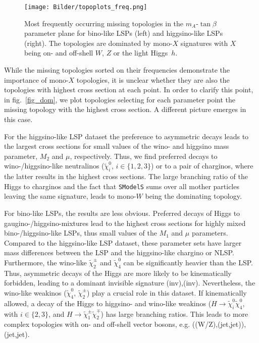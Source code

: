 \documentclass[11pt,a4paper]{article}
\begin{document}
\begin{figure}[h]
\centering
\texttt{[image: Bilder/topoplots\_freq.png]}
\caption{Most frequently occurring missing topologies in the $m_A$-$\tan\beta$ parameter plane for bino-like LSPs (left) and higgsino-like LSPs (right). The topologies are dominated by mono-$X$ signatures with $X$ being on- and off-shell $W$, $Z$ or the light Higgs~$h$.}\label{fig_freq}
\end{figure}
While the missing topologies sorted on their frequencies demonstrate the importance of mono-$X$ topologies, it is unclear whether they are also the topologies with highest cross section at each point. In order to clarify this point, in fig.~\ref{fig_dom}, we plot topologies selecting for each parameter point the missing topology with the highest cross section. A different picture emerges in this case.

For the higgsino-like LSP dataset the preference to asymmetric decays leads to the largest cross sections for small values of the wino- and higgsino mass parameter, $M_2$ and $\mu$, respectively. Thus, we find preferred decays to wino-/higgsino-like neutralinos ($\tilde{\chi}_i^0$, $i\in \lbrace 1,2,3\rbrace$) or to a pair of charginos, where the latter results in the highest cross sections. The large branching ratio of the Higgs to charginos and the fact that \texttt{SModelS} sums over all mother particles leaving the same signature, leads to mono-$W$ being the dominating topology.

For bino-like LSPs, the results are less obvious. Preferred decays of Higgs to gaugino-/higgsino-mixtures lead to the highest cross sections for highly mixed bino-/higgsino-like LSPs, thus small values of the $M_1$ and $\mu$ parameters. Compared to the higgsino-like LSP dataset, these parameter sets have larger mass differences between the LSP and the higgsino-like chargino or NLSP. Furthermore, the wino-like $\tilde{\chi}_2^\pm$ and $\tilde{\chi}_4^0$ can be significantly heavier than the LSP. Thus, asymmetric decays of the Higgs are more likely to be kinematically forbidden, leading to a dominant invisible signature (inv),(inv). Nevertheless, the wino-like weakinos ($\tilde{\chi}_4^0$, $\tilde{\chi}_2^\pm$) play a crucial role in this dataset. If kinematically allowed, a decay of the Higgs to higgsino- and wino-like weakinos ($H\rightarrow \tilde{\chi}_i^0\tilde{\chi}_4^0$, with $i\in\lbrace 2,3 \rbrace$, and $H\rightarrow \tilde{\chi}_1^\pm\tilde{\chi}_2^\mp$) has large branching ratios. This leads to more complex topologies with on- and off-shell vector bosons, e.g. ((W/Z),(jet,jet)),(jet,jet).
\end{document}
